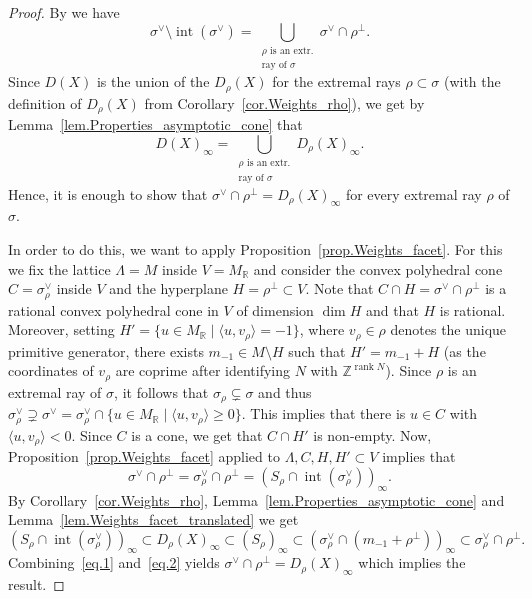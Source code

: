 \documentclass[JEP,XML,SOM,Unicode]{cedram}
\let\oldvee\vee
\renewcommand{\vee}{{\scriptscriptstyle\oldvee}}
\let\oldbot\bot
\renewcommand{\bot}{{\scriptscriptstyle\oldbot}}
\theoremstyle{plain}
\theoremstyle{definition}
\DeclareMathOperator{\rank}{rank}
\DeclareMathOperator{\inter}{int}
\newcommand{\RR}{\mathbb{R}}
\newcommand{\ZZ}{\mathbb{Z}}
\newcommand{\set}[2]{\{#1 \mid #2\}}
\newcommand{\sprod}[2]{\langle #1, #2 \rangle}
\begin{document}
\begin{proof}
By \cite[Propty\,(7), p.\,10]{Fu1993Introduction-to-to} we have
\[
\sigma^\vee \setminus \inter(\sigma^\vee) = \bigcup_{\substack{
\textrm{$\rho$ is an extr.} \\
\textrm{ray of $\sigma$}
}} \sigma^\vee \cap \rho^\bot.
\]
Since $D(X)$ is the union of the $D_{\rho}(X)$ for the extremal rays $\rho \subset \sigma$
(with the definition of $D_\rho(X)$ from Corollary~\ref{cor.Weights_rho}),
we get by Lemma~\ref{lem.Properties_asymptotic_cone} that
\[
D(X)_{\infty} = \bigcup_{\substack{
\textrm{$\rho$ is an extr.} \\
\textrm{ray of $\sigma$}
}} D_{\rho}(X)_{\infty}.
\]
Hence, it is enough to show that $\sigma^\vee \cap \rho^\bot = D_{\rho}(X)_{\infty}$
for every extremal ray $\rho$ of $\sigma$.

In order to do this,
we want to apply Proposition~\ref{prop.Weights_facet}.
For this we fix the lattice $\Lambda = M$ inside $V = M_{\RR}$ and consider
the convex polyhedral cone $C =\sigma_{\rho}^\vee$ inside $V$
and the hyperplane $H = \rho^\bot \subset V$. Note that
$C \cap H = \sigma^\vee \cap \rho^\bot$ is a rational convex polyhedral cone in $V$ of dimension
$\dim H$ and that $H$ is rational.
Moreover, setting $H' = \set{u \in M_{\RR}}{\sprod{u}{v_{\rho}} =-1}$, where $v_\rho \in \rho$
denotes the unique primitive generator,
there exists $m_{-1} \in M \setminus H$ such that $H' = m_{-1} + H$ (as the coordinates
of $v_{\rho}$ are coprime after identifying $N$ with $\ZZ^{\rank N}$).
Since $\rho$ is an extremal ray
of $\sigma$, it follows that $\sigma_{\rho} \subsetneq \sigma$ and thus
$\sigma_{\rho}^\vee \supsetneq \sigma^\vee =
\sigma_{\rho}^\vee \cap \set{u \in M_{\RR}}{\sprod{u}{v_{\rho}}\geq 0}$. This implies that
there is $u \in C$ with $\sprod{u}{v_{\rho}}<0$. Since $C$
is a cone, we get that $C \cap H'$ is non-empty. Now, Proposition~\ref{prop.Weights_facet} applied to $\Lambda, C, H, H' \subset V$
implies that
\[
\label{eq.1}
\tag{d}
\sigma^\vee \cap \rho^\bot = \sigma_{\rho}^\vee \cap \rho^\bot =
(S_{\rho} \cap \inter(\sigma_{\rho}^\vee))_{\infty}.
\]
By Corollary~\ref{cor.Weights_rho}, Lemma~\ref{lem.Properties_asymptotic_cone}
and Lemma~\ref{lem.Weights_facet_translated} we get
\[
\label{eq.2}
\tag{e}
(S_{\rho} \cap \inter(\sigma_{\rho}^\vee))_{\infty} \subset D_{\rho}(X)_{\infty}
\subset (S_{\rho})_{\infty}
\subset (\sigma_{\rho}^\vee \cap (m_{-1} + \rho^\bot))_{\infty}
\subset \sigma_{\rho}^\vee \cap \rho^\bot
.
\]
Combining~\eqref{eq.1} and~\eqref{eq.2} yields
$\sigma^\vee \cap \rho^\bot = D_{\rho}(X)_{\infty}$ which implies the result.
\end{proof}
\end{document}
